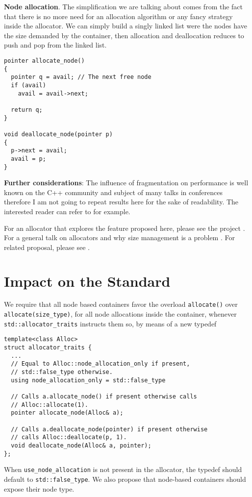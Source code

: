 \documentclass[11pt]{article}
\begin{document}
\noindent
{\bf Node allocation}.  The simplification we are talking about comes from the
fact that there is no more need for an allocation algorithm or any fancy
strategy inside the allocator. We can simply build a singly linked list were
the nodes have the size demanded by the container, then allocation and
deallocation reduces to push and pop from the linked list.

\medskip
\begin{lstlisting}
pointer allocate_node()
{
  pointer q = avail; // The next free node
  if (avail)
    avail = avail->next;

  return q;
}

void deallocate_node(pointer p)
{
  p->next = avail;
  avail = p;
}

\end{lstlisting}

\medskip
\noindent
{\bf Further considerations}: The influence of fragmentation on
performance is well known on the C++ community and subject of many
talks in conferences therefore I am not going to repeat results here
for the sake of readability. The interested reader can refer to
\cite{chandler, meyers} for example.

For an allocator that explores the feature proposed here, please see
the project \cite{rtcpp}. For a general
talk on allocators and why size management is a problem
\cite{alexandrescu}. For related proposal, please see \cite{prop1}.



\section{Impact on the Standard} \label{impact}

We require that all node based containers favor the overload
\texttt{allocate()} over \texttt{allocate(size\_type)}, for all node
allocations inside the container, whenever
\texttt{std::allocator\_traits} instructs them so, by means of a new
typedef
\medskip
\begin{lstlisting}
template<class Alloc>
struct allocator_traits {
  ...
  // Equal to Alloc::node_allocation_only if present,
  // std::false_type otherwise.
  using node_allocation_only = std::false_type

  // Calls a.allocate_node() if present otherwise calls
  // Alloc::allocate(1).
  pointer allocate_node(Alloc& a);

  // Calls a.deallocate_node(pointer) if present otherwise
  // calls Alloc::deallocate(p, 1).
  void deallocate_node(Alloc& a, pointer);
};
\end{lstlisting}
When \texttt{use\_node\_allocation} is not present in the allocator,
the typedef should default to \texttt{std::false\_type}.
We also propose that node-based containers should expose their node type.
\end{document}
